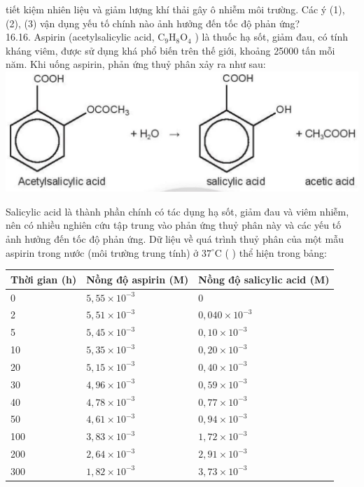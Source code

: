\documentclass[10pt]{article}
\begin{document}
tiết kiệm nhiên liệu và giảm lượng khí thải gây ô nhiễm môi trường. Các ý (1), (2), (3) vận dụng yếu tố chính nào ảnh hưởng đến tốc độ phản ứng?\\
16.16. Aspirin (acetylsalicylic acid, $\mathrm{C}_{9} \mathrm{H}_{8} \mathrm{O}_{4}$ ) là thuốc hạ sốt, giảm đau, có tính kháng viêm, được sử dụng khá phổ biến trên thế giới, khoảng 25000 tấn mỗi năm. Khi uống aspirin, phản ứng thuỷ phân xảy ra như sau:\\
\includegraphics[max width=\textwidth, center]{2025_10_23_883c4b146e2332109fcdg-66}

Salicylic acid là thành phần chính có tác dụng hạ sốt, giảm đau và viêm nhiễm, nên có nhiều nghiên cứu tập trung vào phản ứng thuỷ phân này và các yếu tố ảnh hưởng đến tốc độ phản ứng. Dữ liệu về quá trình thuỷ phân của một mẫu aspirin trong nước (môi trường trung tính) ở $37^{\circ} \mathrm{C}$ ( ) thể hiện trong bảng:

\begin{center}
\begin{tabular}{|l|l|l|}
\hline
Thời gian (h) & Nồng độ aspirin (M) & Nồng độ salicylic acid (M) \\
\hline
0 & $5,55 \times 10^{-3}$ & 0 \\
\hline
2 & $5,51 \times 10^{-3}$ & $0,040 \times 10^{-3}$ \\
\hline
5 & $5,45 \times 10^{-3}$ & $0,10 \times 10^{-3}$ \\
\hline
10 & $5,35 \times 10^{-3}$ & $0,20 \times 10^{-3}$ \\
\hline
20 & $5,15 \times 10^{-3}$ & $0,40 \times 10^{-3}$ \\
\hline
30 & $4,96 \times 10^{-3}$ & $0,59 \times 10^{-3}$ \\
\hline
40 & $4,78 \times 10^{-3}$ & $0,77 \times 10^{-3}$ \\
\hline
50 & $4,61 \times 10^{-3}$ & $0,94 \times 10^{-3}$ \\
\hline
100 & $3,83 \times 10^{-3}$ & $1,72 \times 10^{-3}$ \\
\hline
200 & $2,64 \times 10^{-3}$ & $2,91 \times 10^{-3}$ \\
\hline
300 & $1,82 \times 10^{-3}$ & $3,73 \times 10^{-3}$ \\
\hline
\end{tabular}
\end{center}
\end{document}
